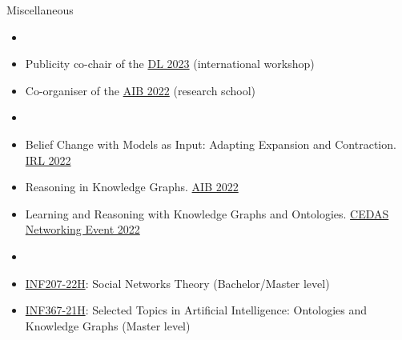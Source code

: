 %

\begin{rSection}{Miscellaneous}
    \begin{description}[nosep]
        \item[Event Organisation:] {
            \begin{itemize}
                \item[]
                \item Publicity co-chair of the \href{https://dl2023.w.uib.no/}{DL 2023} (international workshop)
                \item Co-organiser of the \href{https://researchschool.w.uib.no/}{AIB 2022} (research school) 
            \end{itemize}
        }
        \item[Invited Talks:]{
            \begin{itemize}[nosep]
                \item[]
                \item Belief Change with Models as Input: Adapting Expansion and Contraction. \href{https://web.archive.org/web/20221205091252/https://irl.w.uib.no/}{IRL 2022}
                \item Reasoning in Knowledge Graphs. \href{https://researchschool.w.uib.no/}{AIB 2022}
                \item Learning and Reasoning with Knowledge Graphs and Ontologies. \href{https://web.archive.org/web/20221022003238/http://www.uib.no/en/cedas/154942/cedas-networking-event-2022#}{CEDAS Networking Event 2022}
            \end{itemize}
        }
        \item[Teaching]{
            \begin{itemize}[nosep]
                \item[]
                \item \href{https://web.archive.org/web/20220707214216/https://www.uib.no/en/course/INF207#}{INF207-22H}: Social Networks Theory (Bachelor/Master level)
                \item \href{https://web.archive.org/web/20210918132515/https://www.uib.no/en/course/INF367#}{INF367-21H}: Selected Topics in Artificial Intelligence: Ontologies and Knowledge Graphs (Master level)
            \end{itemize}
        }
        \item[Code Projects]{
}
\end{description}
\end{rSection}
